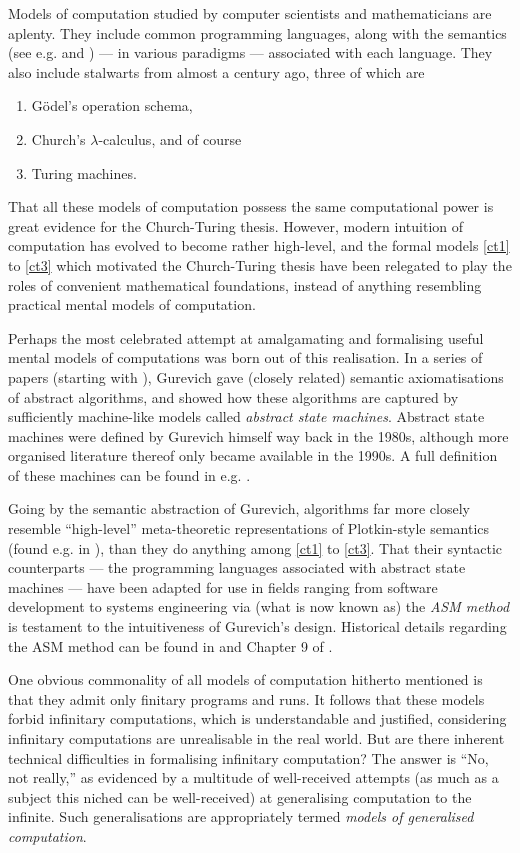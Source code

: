 \documentclass[12pt, twoside]{memoir}
\numberwithin{equation}{section}
\theoremstyle{definition}
\theoremstyle{remark}
\theoremstyle{definition}
\theoremstyle{definition}
\theoremstyle{definition}
\theoremstyle{remark}
\begin{document}
Models of computation studied by computer scientists and mathematicians are aplenty. They include common programming languages, along with the semantics (see e.g.\cite{scott} and \cite{meyer}) --- in various paradigms --- associated with each language. They also include stalwarts from almost a century ago, three of which are
\begin{enumerate}[leftmargin=40pt, label=(CT\arabic*)]
    \item\label{ct1} G\"{o}del's operation schema,
    \item Church's $\lambda$-calculus, and of course
    \item\label{ct3} Turing machines.
\end{enumerate}
That all these models of computation possess the same computational power is great evidence for the Church-Turing thesis. However, modern intuition of computation has evolved to become rather high-level, and the formal models \ref{ct1} to \ref{ct3} which motivated the Church-Turing thesis have been relegated to play the roles of convenient mathematical foundations, instead of anything resembling practical mental models of computation.

Perhaps the most celebrated attempt at amalgamating and formalising useful mental models of computations was born out of this realisation. In a series of papers (starting with \cite{gurevich}), Gurevich gave (closely related) semantic axiomatisations of abstract algorithms, and showed how these algorithms are captured by sufficiently machine-like models called \textit{abstract state machines}. Abstract state machines were defined by Gurevich himself way back in the 1980s, although more organised literature thereof only became available in the 1990s. A full definition of these machines can be found in e.g. \cite{evolvingalg}.

Going by the semantic abstraction of Gurevich, algorithms far more closely resemble ``high-level'' meta-theoretic representations of Plotkin-style semantics (found e.g. in \cite{plotkin}), than they do anything among \ref{ct1} to \ref{ct3}. That their syntactic counterparts --- the programming languages associated with abstract state machines --- have been adapted for use in fields ranging from software development to systems engineering via (what is now known as) the \textit{ASM method} is testament to the intuitiveness of Gurevich's design. Historical details regarding the ASM method can be found in \cite{borger} and Chapter 9 of \cite{borgerbook}.

One obvious commonality of all models of computation hitherto mentioned is that they admit only finitary programs and runs. It follows that these models forbid infinitary computations, which is understandable and justified, considering infinitary computations are unrealisable in the real world. But are there inherent technical difficulties in formalising infinitary computation? The answer is ``No, not really,'' as evidenced by a multitude of well-received attempts (as much as a subject this niched can be well-received) at generalising computation to the infinite. Such generalisations are appropriately termed \textit{models of generalised computation}.
\end{document}
